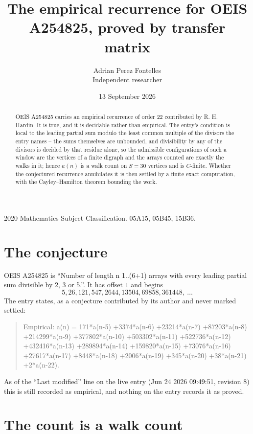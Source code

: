 \documentclass[11pt,a4paper]{article}
\title{The empirical recurrence for OEIS A254825, proved by transfer matrix}
\author{Adrian Perez Fontelles\\ \small Independent researcher}
\date{13 September 2026}
\theoremstyle{plain}
\theoremstyle{definition}
\begin{document}
\maketitle

\begin{abstract}
OEIS A254825 carries an empirical recurrence of order $22$ contributed by R. H. Hardin. It is
true, and it is decidable rather than empirical. The entry's condition is local to the leading partial sum modulo the least common multiple of the divisors the entry names -- the sums themselves are unbounded, and divisibility by any of the divisors is decided by that residue alone, so
the admissible configurations of such a window are the vertices of a finite digraph and the
arrays counted are exactly the walks in it; hence $a(n)$ is a walk count on $S=30$ vertices
and is $C$-finite. Whether the conjectured recurrence annihilates it is then settled by a
finite exact computation, with the Cayley--Hamilton theorem bounding the work.
\end{abstract}

\noindent\small 2020 Mathematics Subject Classification. 05A15, 05B45, 15B36.\normalsize

\section{The conjecture}

OEIS A254825 is ``Number of length n 1..(6+1) arrays with every leading partial sum divisible by 2, 3 or 5.''. It has offset $1$ and begins
\[
5, 26, 121, 547, 2644, 13504, 69858, 361448,\ \dots
\]
The entry states, as a conjecture contributed by its author and never marked settled:
\begin{quote}
Empirical: a(n) = 171*a(n-5) +3374*a(n-6) +23214*a(n-7) +87203*a(n-8) +214299*a(n-9) +377802*a(n-10) +503302*a(n-11) +522736*a(n-12) +432416*a(n-13) +289894*a(n-14) +159820*a(n-15) +73076*a(n-16) +27617*a(n-17) +8448*a(n-18) +2006*a(n-19) +345*a(n-20) +38*a(n-21) +2*a(n-22).
\end{quote}
As of the ``Last modified'' line on the live entry (Jun 24 2026 09:49:51, revision 8) this is still
recorded as empirical, and nothing on the entry records it as proved.

\section{The count is a walk count}
\end{document}
